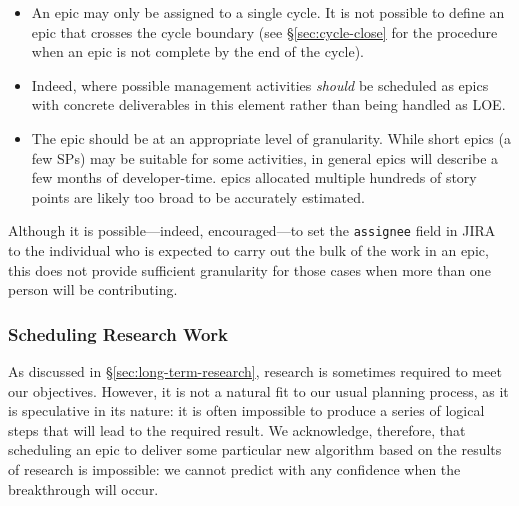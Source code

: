 \begin{itemize}
\item An \gls{epic} may only be assigned to a single \gls{cycle}.
  It is not possible to define an \gls{epic} that crosses the \gls{cycle} boundary (see \S\ref{sec:cycle-close} for the procedure when an \gls{epic} is not complete by the end of the \gls{cycle}).
\item Indeed, where possible management activities \emph{should} be scheduled as \glspl{epic} with concrete deliverables in this \gls{element} rather than being handled as \gls{LOE}.
\item The \gls{epic} should be at an appropriate level of granularity.
  While short \glspl{epic} (a few \glspl{SP}) may be suitable for some activities, in general \glspl{epic} will describe a few months of developer-time.
  \Glspl{epic} allocated multiple hundreds of \gls{story} points are likely too broad to be accurately estimated.
\end{itemize}


Although it is possible---indeed, encouraged---to set the \texttt{assignee} field in \gls{JIRA} to the individual who is expected to carry out the bulk of the work in an \gls{epic}, this does not provide sufficient granularity for those cases when more than one person will be contributing.



\subsubsection{Scheduling Research Work} \label{sec:research}

As discussed in \S\ref{sec:long-term-research}, research is sometimes required
to meet our objectives. However, it is not a natural fit to our usual
planning process, as it is speculative in its nature: it is often
impossible to produce a series of logical steps that will lead to the
required result. We acknowledge, therefore, that scheduling an \gls{epic} to
deliver some particular new \gls{algorithm} based on the results of research
is impossible: we cannot predict with any confidence when the
breakthrough will occur.

